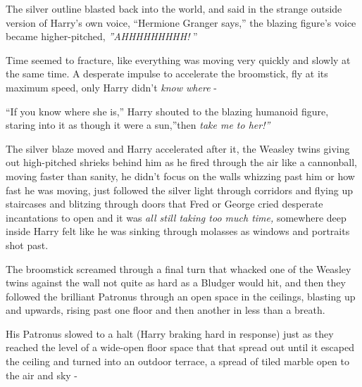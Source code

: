The silver outline blasted back into the world, and said in the strange
outside version of Harry's own voice, ``Hermione Granger says,'' the
blazing figure's voice became higher-pitched, \emph{''AHHHHHHHHH!} ''

Time seemed to fracture, like everything was moving very quickly and
slowly at the same time. A desperate impulse to accelerate the
broomstick, fly at its maximum speed, only Harry didn't \emph{know
where} -

``If you know where she is,'' Harry shouted to the blazing humanoid
figure, staring into it as though it were a sun,''then \emph{take me to
her!''}

The silver blaze moved and Harry accelerated after it, the Weasley twins
giving out high-pitched shrieks behind him as he fired through the air
like a cannonball, moving faster than sanity, he didn't focus on the
walls whizzing past him or how fast he was moving, just followed the
silver light through corridors and flying up staircases and blitzing
through doors that Fred or George cried desperate incantations to open
and it was \emph{all still taking too much time,} somewhere deep inside
Harry felt like he was sinking through molasses as windows and portraits
shot past.

The broomstick screamed through a final turn that whacked one of the
Weasley twins against the wall not quite as hard as a Bludger would hit,
and then they followed the brilliant Patronus through an open space in
the ceilings, blasting up and upwards, rising past one floor and then
another in less than a breath.

His Patronus slowed to a halt (Harry braking hard in response) just as
they reached the level of a wide-open floor space that that spread out
until it escaped the ceiling and turned into an outdoor terrace, a
spread of tiled marble open to the air and sky -
